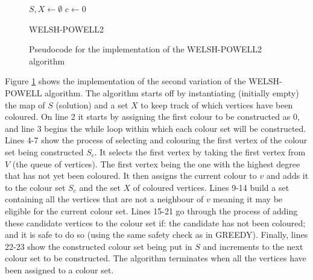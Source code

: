 \begin{figure}[H]
    \centering
        \begin{algorithm}[H]
        \DontPrintSemicolon
        
        \BlankLine

        $S, X \leftarrow \emptyset$ \;
        $c \leftarrow 0$ \;
       
        
        \caption{WELSH-POWELL2}
        \end{algorithm}
    \caption{Pseudocode for the implementation of the WELSH-POWELL2 algorithm}
    \label{fig:WP2ImpPseudo}
\end{figure}

Figure \ref{fig:WP2ImpPseudo} shows the implementation of the second variation of the WELSH-POWELL algorithm. The algorithm starts off by instantiating (initially empty) the map of $S$ (solution) and a set $X$ to keep track of which vertices have been coloured. On line 2 it starts by assigning the first colour to be constructed as 0, and line 3 begins the while loop within which each colour set will be constructed. Lines 4-7 show the process of selecting and colouring the first vertex of the colour set being constructed $S_{c}$. It selects the first vertex by taking the first vertex from $V$ (the queue of vertices). The first vertex being the one with the highest degree that has not yet been coloured. It then assigns the current colour to $v$ and adds it to the colour set $S_{c}$ and the set $X$ of coloured vertices. Lines 9-14 build a set containing all the vertices that are not a neighbour of $v$ meaning it may be eligible for the current colour set. Lines 15-21 go through the process of adding these candidate vertices to the colour set if: the candidate has not been coloured; and it is safe to do so (using the same safety check as in GREEDY). Finally, lines 22-23 show the constructed colour set being put in $S$ and increments to the next colour set to be constructed. The algorithm terminates when all the vertices have been assigned to a colour set. 

